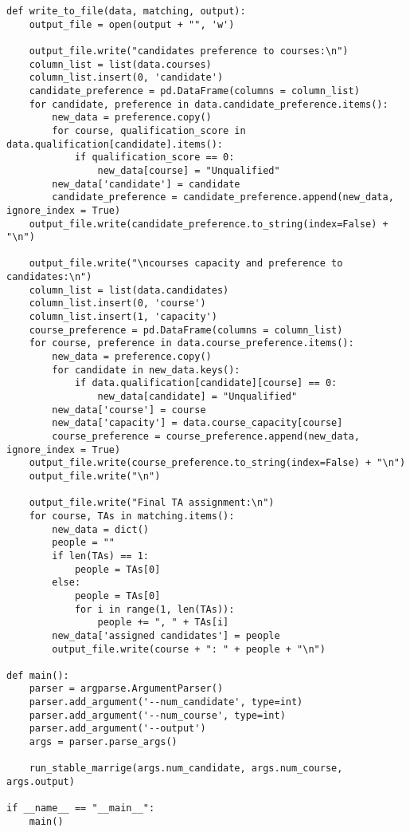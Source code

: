 \documentclass[twoside,twocolumn]{article}
\begin{document}
\begin{appendices}
\begin{verbatim}
def write_to_file(data, matching, output):
    output_file = open(output + "", 'w')

    output_file.write("candidates preference to courses:\n")
    column_list = list(data.courses)
    column_list.insert(0, 'candidate')
    candidate_preference = pd.DataFrame(columns = column_list)
    for candidate, preference in data.candidate_preference.items():
        new_data = preference.copy()
        for course, qualification_score in data.qualification[candidate].items():
            if qualification_score == 0:
                new_data[course] = "Unqualified"
        new_data['candidate'] = candidate
        candidate_preference = candidate_preference.append(new_data, ignore_index = True)
    output_file.write(candidate_preference.to_string(index=False) + "\n")

    output_file.write("\ncourses capacity and preference to candidates:\n")
    column_list = list(data.candidates)
    column_list.insert(0, 'course')
    column_list.insert(1, 'capacity')
    course_preference = pd.DataFrame(columns = column_list)
    for course, preference in data.course_preference.items():
        new_data = preference.copy()
        for candidate in new_data.keys():
            if data.qualification[candidate][course] == 0:
                new_data[candidate] = "Unqualified"
        new_data['course'] = course
        new_data['capacity'] = data.course_capacity[course]
        course_preference = course_preference.append(new_data, ignore_index = True)
    output_file.write(course_preference.to_string(index=False) + "\n")
    output_file.write("\n")

    output_file.write("Final TA assignment:\n")
    for course, TAs in matching.items():
        new_data = dict()
        people = ""
        if len(TAs) == 1:
            people = TAs[0]
        else:
            people = TAs[0]
            for i in range(1, len(TAs)):
                people += ", " + TAs[i]
        new_data['assigned candidates'] = people
        output_file.write(course + ": " + people + "\n")

def main():
    parser = argparse.ArgumentParser()
    parser.add_argument('--num_candidate', type=int)
    parser.add_argument('--num_course', type=int)
    parser.add_argument('--output')
    args = parser.parse_args()

    run_stable_marrige(args.num_candidate, args.num_course, args.output)

if __name__ == "__main__":
    main()

        \end{verbatim}
    \end{appendices}
\end{document}
